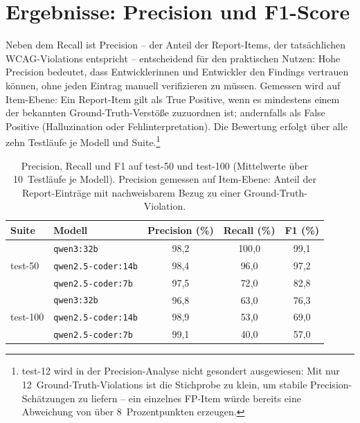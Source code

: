 \section{Ergebnisse: Precision und F1-Score}
\label{sec:ergebnisse_precision}

Neben dem Recall ist Precision -- der Anteil der Report-Items, der tatsächlichen \ac{WCAG}-Violations entspricht -- entscheidend für den praktischen Nutzen: Hohe Precision bedeutet, dass Entwicklerinnen und Entwickler den Findings vertrauen können, ohne jeden Eintrag manuell verifizieren zu müssen. Gemessen wird auf Item-Ebene: Ein Report-Item gilt als True Positive, wenn es mindestens einem der bekannten Ground-Truth-Verstöße zuzuordnen ist; andernfalls als False Positive (Halluzination oder Fehlinterpretation). Die Bewertung erfolgt über alle zehn Testläufe je Modell und Suite.\footnote{test-12 wird in der Precision-Analyse nicht gesondert ausgewiesen: Mit nur 12~Ground-Truth-Violations ist die Stichprobe zu klein, um stabile Precision-Schätzungen zu liefern -- ein einzelnes FP-Item würde bereits eine Abweichung von über 8~Prozentpunkten erzeugen.}

\begin{table}[htbp]
\centering
\small
\renewcommand{\arraystretch}{1.15}
\begin{tabular}{@{}llccc@{}}
\toprule
\textbf{Suite} & \textbf{Modell} & \textbf{Precision (\%)} & \textbf{Recall (\%)} & \textbf{F1 (\%)} \\
\midrule
\multirow{3}{*}{test-50}
& \texttt{qwen3:32b}          & 98{,}2 & 100{,}0 & 99{,}1 \\
& \texttt{qwen2.5-coder:14b}  & 98{,}4 &  96{,}0 & 97{,}2 \\
& \texttt{qwen2.5-coder:7b}   & 97{,}5 &  72{,}0 & 82{,}8 \\
\midrule
\multirow{3}{*}{test-100}
& \texttt{qwen3:32b}          & 96{,}8 &  63{,}0 & 76{,}3 \\
& \texttt{qwen2.5-coder:14b}  & 98{,}9 &  53{,}0 & 69{,}0 \\
& \texttt{qwen2.5-coder:7b}   & 99{,}1 &  40{,}0 & 57{,}0 \\
\bottomrule
\end{tabular}
\caption[Precision, Recall und F1 auf test-50 und test-100]{Precision, Recall und F1 auf test-50 und test-100 (Mittelwerte über 10~Testläufe je Modell). Precision gemessen auf Item-Ebene: Anteil der Report-Einträge mit nachweisbarem Bezug zu einer Ground-Truth-Violation.}
\label{tab:precision_f1}
\end{table}


